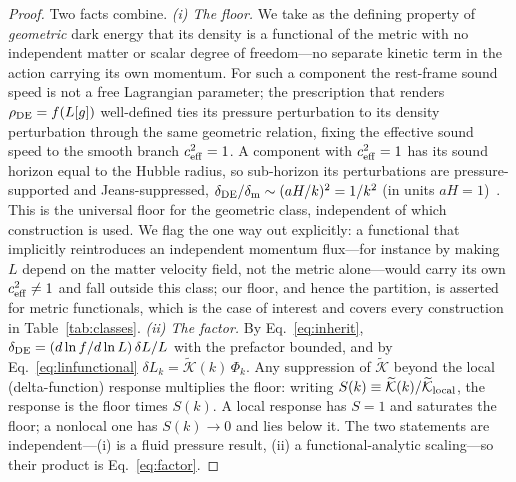 \documentclass[twocolumn,10pt]{article}
\newcommand{\dDE}{\delta_{\rm DE}}
\newcommand{\dm}{\delta_{\rm m}}
\begin{document}
\begin{proof}
Two facts combine. \emph{(i) The floor.} We take as the defining property of
\emph{geometric} dark energy that its density is a functional of the metric with
no independent matter or scalar degree of freedom---no separate kinetic term in
the action carrying its own momentum. For such a component the rest-frame sound
speed is not a free Lagrangian parameter; the prescription that renders
$\rho_{\rm DE}=f(L[g])$ well-defined ties its pressure perturbation to its
density perturbation through the same geometric relation, fixing the effective
sound speed to the smooth branch $c_{\rm eff}^2=1$. A component with
$c_{\rm eff}^2=1$ has its sound horizon equal to the Hubble radius, so
sub-horizon its perturbations are pressure-supported and Jeans-suppressed,
$\dDE/\dm\sim(aH/k)^2=1/k^2$ (in units $aH=1$)~\cite{Hu1998,WellerLewis2003}.
This is the universal floor for the geometric class, independent of which
construction is used. We flag the one way out explicitly: a functional that
implicitly reintroduces an independent momentum flux---for instance by making
$L$ depend on the matter velocity field, not the metric alone---would carry its
own $c_{\rm eff}^2\neq1$ and fall outside this class; our floor, and hence the
partition, is asserted for metric functionals, which is the case of interest and
covers every construction in Table~\ref{tab:classes}. \emph{(ii) The factor.} By
Eq.~\eqref{eq:inherit}, $\dDE=(d\ln f/d\ln L)\,\delta L/L$ with the prefactor
bounded, and by Eq.~\eqref{eq:linfunctional} $\delta L_k=\widetilde{\mathcal
K}(k)\,\Phi_k$. Any suppression of $\widetilde{\mathcal K}$ beyond the local
(delta-function) response multiplies the floor: writing $S(k)\equiv
\widetilde{\mathcal K}(k)/\widetilde{\mathcal K}_{\rm local}$, the response is
the floor times $S(k)$. A local response has $S=1$ and saturates the floor; a
nonlocal one has $S(k)\to0$ and lies below it. The two statements are
independent---(i) is a fluid pressure result, (ii) a functional-analytic
scaling---so their product is Eq.~\eqref{eq:factor}.
\end{proof}
\end{document}
